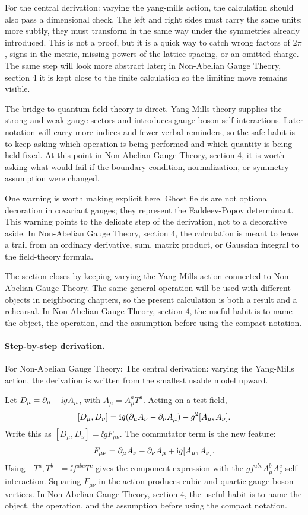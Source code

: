 For the central derivation: varying the yang-mills action, the calculation should also pass a dimensional check.  The left and right sides must carry the same units; more subtly, they must transform in the same way under the symmetries already introduced.  This is not a proof, but it is a quick way to catch wrong factors of \(2\pi\), signs in the metric, missing powers of the lattice spacing, or an omitted charge.  The same step will look more abstract later; in Non-Abelian Gauge Theory, section 4 it is kept close to the finite calculation so the limiting move remains visible.

The bridge to quantum field theory is direct.  Yang-Mills theory supplies the strong and weak gauge sectors and introduces gauge-boson self-interactions.  Later notation will carry more indices and fewer verbal reminders, so the safe habit is to keep asking which operation is being performed and which quantity is being held fixed.  At this point in Non-Abelian Gauge Theory, section 4, it is worth asking what would fail if the boundary condition, normalization, or symmetry assumption were changed.

One warning is worth making explicit here.  Ghost fields are not optional decoration in covariant gauges; they represent the Faddeev-Popov determinant.  This warning points to the delicate step of the derivation, not to a decorative aside.  In Non-Abelian Gauge Theory, section 4, the calculation is meant to leave a trail from an ordinary derivative, sum, matrix product, or Gaussian integral to the field-theory formula.

The section closes by keeping varying the Yang-Mills action connected to Non-Abelian Gauge Theory.  The same general operation will be used with different objects in neighboring chapters, so the present calculation is both a result and a rehearsal.  In Non-Abelian Gauge Theory, section 4, the useful habit is to name the object, the operation, and the assumption before using the compact notation.



\paragraph{Step-by-step derivation.}

For Non-Abelian Gauge Theory: The central derivation: varying the Yang-Mills action, the derivation is written from the smallest usable model upward.

Let \(D_\mu=\partial_\mu+\mathrm i gA_\mu\), with \(A_\mu=A_\mu^aT^a\).  Acting on a test field,
\[
  [D_\mu,D_\nu]
  =
  \mathrm i g(\partial_\mu A_\nu-\partial_\nu A_\mu)-g^2[A_\mu,A_\nu].
\]
Write this as \([D_\mu,D_\nu]=\ii gF_{\mu\nu}\).  The commutator term is the new feature:
\[
  F_{\mu\nu}=\partial_\mu A_\nu-\partial_\nu A_\mu+\mathrm i g[A_\mu,A_\nu].
\]
Using \([T^a,T^b]=\ii f^{abc}T^c\) gives the component expression with the \(gf^{abc}A_\mu^bA_\nu^c\) self-interaction.  Squaring \(F_{\mu\nu}\) in the action produces cubic and quartic gauge-boson vertices.  In Non-Abelian Gauge Theory, section 4, the useful habit is to name the object, the operation, and the assumption before using the compact notation.

